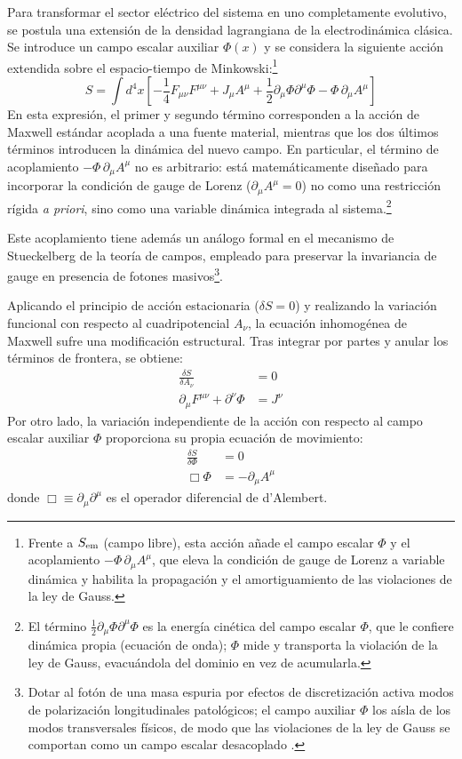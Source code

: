 \primerparrafo Para transformar el sector eléctrico del sistema en uno completamente evolutivo, se postula una extensión de la densidad lagrangiana de la electrodinámica clásica. Se introduce un campo escalar auxiliar $\Phi(x)$ y se considera la siguiente acción extendida sobre el espacio-tiempo de Minkowski:\footnote{Frente a $S_{\rm em}$ (campo libre), esta acción añade el campo escalar $\Phi$ y el acoplamiento $-\Phi\,\partial_\mu A^\mu$, que eleva la condición de gauge de Lorenz a variable dinámica y habilita la propagación y el amortiguamiento de las violaciones de la ley de Gauss.}
\begin{equation}
    S = \int d^4x \left[ -\frac{1}{4}F_{\mu\nu}F^{\mu\nu} + J_\mu A^\mu + \frac{1}{2}\partial_\mu \Phi \partial^\mu \Phi - \Phi\, \partial_\mu A^\mu \right]
\end{equation}
En esta expresión, el primer y segundo término corresponden a la acción de Maxwell estándar acoplada a una fuente material, mientras que los dos últimos términos introducen la dinámica del nuevo campo. En particular, el término de acoplamiento $-\Phi\, \partial_\mu A^\mu$ no es arbitrario: está matemáticamente diseñado para incorporar la condición de gauge de Lorenz ($\partial_\mu A^\mu = 0$) no como una restricción rígida \textit{a priori}, sino como una variable dinámica integrada al sistema.\footnote{El término $\tfrac12\partial_\mu\Phi\partial^\mu\Phi$ es la energía cinética del campo escalar $\Phi$, que le confiere dinámica propia (ecuación de onda); $\Phi$ mide y transporta la violación de la ley de Gauss, evacuándola del dominio en vez de acumularla.}

Este acoplamiento tiene además un análogo formal en el mecanismo de Stueckelberg de la teoría de campos, empleado para preservar la invariancia de gauge en presencia de fotones masivos\footnote{Dotar al fotón de una masa espuria por efectos de discretización activa modos de polarización longitudinales patológicos; el campo auxiliar $\Phi$ los aísla de los modos transversales físicos, de modo que las violaciones de la ley de Gauss se comportan como un campo escalar desacoplado \parencite{lee2004}.}.

Aplicando el principio de acción estacionaria ($\delta S = 0$) y realizando la variación funcional con respecto al cuadripotencial $A_\nu$, la ecuación inhomogénea de Maxwell sufre una modificación estructural. Tras integrar por partes y anular los términos de frontera, se obtiene:
\begin{align}
    \frac{\delta S}{\delta A_\nu} &= 0 \nonumber \\
    \partial_\mu F^{\mu\nu} + \partial^\nu \Phi &= J^\nu \label{eq:GLM_Phi_Maxwell}
\end{align}
Por otro lado, la variación independiente de la acción con respecto al campo escalar auxiliar $\Phi$ proporciona su propia ecuación de movimiento:
\begin{align}
    \frac{\delta S}{\delta \Phi} &= 0 \nonumber \\
    \Box \Phi &= -\partial_\mu A^\mu \label{eq:GLM_Phi_Wave}
\end{align}
donde $\Box \equiv \partial_\mu \partial^\mu$ es el operador diferencial de d'Alembert.

